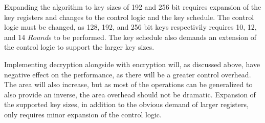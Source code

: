 Expanding the algorithm to key sizes of 192 and 256 bit requires
expansion of the key registers and changes to the control logic and
the key schedule. The control logic must be changed, as 128, 192, and
256 bit keys respectivily requires 10, 12, and 14 $Round$s to be
performed. The key schedule also demands an extension of the control
logic to support the larger key sizes.

Implementing decryption alongside with encryption will, as discussed
above, have negative effect on the performance, as there will be a
greater control overhead. The area will also increase, but as most of
the operations can be generalized to also provide an inverse, the area
overhead should not be dramatic. Expansion of the supported key sizes,
in addition to the obvious demand of larger registers, only requires
minor expansion of the control logic.
